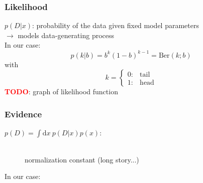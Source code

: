 \documentclass[t]{beamer}
\newcommand{\todo}{\textcolor{red}{\textbf{TODO}}}
\renewcommand{\d}{\mathrm{d}}
\begin{document}
\begin{frame}
  \frametitle{Likelihood}
  $p(D|x)$: probability of the data given fixed model parameters\\
  $\rightarrow$ models data-generating process\\
  \bigbreak
  In our case:
  \begin{equation*}
    p(k|b) = b^k(1-b)^{k-1} = \mathrm{Ber}(k;b)
  \end{equation*}
  with
  \begin{equation*}
    k = \begin{cases} 0:& \mathrm{tail}\\
      1:& \mathrm{head}
    \end{cases}
  \end{equation*}
  \todo: graph of likelihood function
\end{frame}


\begin{frame}
  \frametitle{Evidence}
  \begin{description}
  \item[$p(D) = \int \d x\ p(D|x)p(x)$:]\hfill \\
    normalization constant (long story...)
  \end{description}
  In our case:
\end{frame}
\end{document}
